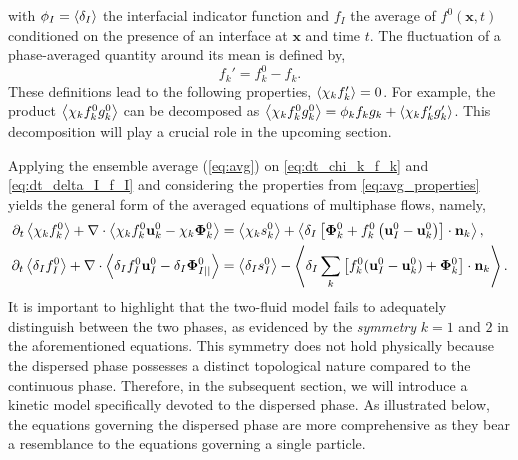 with $\phi_I = \left<\delta_I\right>$ the interfacial indicator function and $f_I$ the average of $f^0(\textbf{x},t)$ conditioned on the presence of an interface at $\textbf{x}$ and time $t$. 
The fluctuation of a phase-averaged quantity around its mean is defined by,
\begin{equation}
    f_k' = f_k^0 - f_k.
    \label{eq:def_fluctu}
\end{equation}
These definitions lead to the following properties, $\left<\chi_k f'_k\right> = 0$. 
For example, the product $\left<\chi_k f^0_kg^0_k\right>$ can be decomposed as $\left<\chi_k f_k^0g_k^0\right>=\phi_k f_kg_k + \left<\chi_k f'_kg'_k\right>$. 
This decomposition will play a crucial role in the upcoming section. 


Applying the ensemble average (\ref{eq:avg}) on \ref{eq:dt_chi_k_f_k} and \ref{eq:dt_delta_I_f_I} and considering the properties from \ref{eq:avg_properties} yields the general form of the averaged equations of multiphase flows, namely,
\begin{align}
    \partial_t \left<\chi_k f_k^0\right>
    +\mathbf{\nabla}\cdot \left<\chi_k f_k^0 \textbf{u}_k^0 - \chi_k \mathbf{\Phi}_k^0\right>
    &= 
    \left<\chi_k s_k^0\right>
    + \left<\delta_I\left[
        \mathbf{\Phi}_k^0
        + f_k^0
        \left(
            \textbf{u}_I^0
            - \textbf{u}_k^0
        \right)
    \right]
    \cdot \textbf{n}_k\right> ,
    \label{eq:avg_dt_chi_f}\\
    \partial_t \left<\delta_If_I^0\right>
    +\mathbf{\nabla}\cdot \left<\delta_I f_I^0 \textbf{u}_I^0-\delta_I \mathbf{\Phi}_{I||}^0 \right>
    &= 
    \left<\delta_Is_I^0\right> 
    - \left<\delta_I 
    \sum_k \left[
    f_k^0 (\textbf{u}_I^0 - \textbf{u}_k^0)
    + \mathbf{\Phi}_k^0
    \right] \cdot \textbf{n}_k 
     \right>.
    \label{eq:avg_dt_delta_f}
\end{align}
It is important to highlight that the two-fluid model fails to adequately distinguish between the two phases, as evidenced by the \textit{symmetry} $k = 1$ and $2$ in the aforementioned equations. This symmetry does not hold physically because the dispersed phase possesses a distinct topological nature compared to the continuous phase. Therefore, in the subsequent section, we will introduce a kinetic model specifically devoted to the dispersed phase. As illustrated below, the equations governing the dispersed phase are more comprehensive as they bear a resemblance to the equations governing a single particle.

